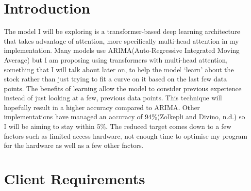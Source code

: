 \documentclass{article}
\begin{document}
\section{Introduction}
The model I will be exploring is a transformer-based deep learning architecture that takes advantage of attention, more specifically multi-head attention in my implementation.
Many models use ARIMA(Auto-Regressive Integrated Moving Average) but I am proposing using transformers with multi-head attention, something that I will talk about later on, to help the model ‘learn’ about the stock rather than just trying to fit a curve on it based on the last few data points. The benefits of learning allow the model to consider previous experience instead of just looking at a few, previous data points. This technique will hopefully result in a higher accuracy compared to ARIMA. Other implementations have managed an accuracy of 94\%(Zolkepli and Divino, n.d.) so I will be aiming to stay within 5\%. The reduced target comes down to a few factors such as limited access hardware, not enough time to optimise my program for the hardware as well as a few other factors.
\clearpage
\section{Client Requirements}
\end{document}

